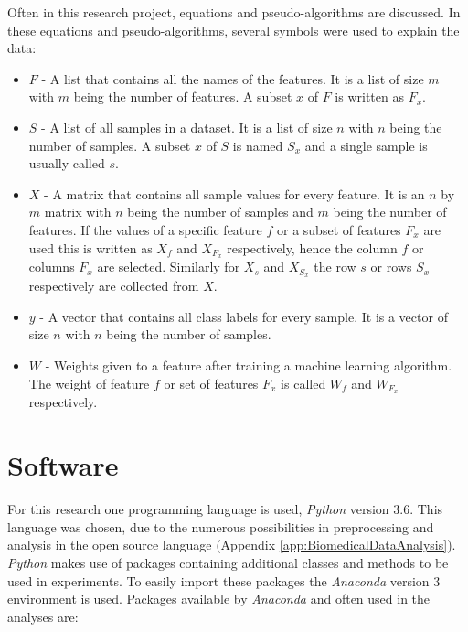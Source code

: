 \documentclass[10pt,a4paper]{report}
\begin{document}
	Often in this research project, equations and pseudo-algorithms are discussed. In these equations and pseudo-algorithms, several symbols were used to explain the data:
	
	\begin{itemize}
		\item \textit{$F$} -
		A list that contains all the names of the features. It is a list of size $m$ with $m$ being the number of features. A subset $x$ of $F$ is written as $F_x$.
		\item \textit{$S$} -  
		A list of all samples in a dataset. It is a list of size $n$ with $n$ being the number of samples. A subset $x$ of $S$ is named $S_x$ and a single sample is usually called $s$. 
		\item \textit{$X$} -
		A matrix that contains all sample values for every feature. It is an $n$ by $m$ matrix with $n$ being the number of samples and $m$ being the number of features. If the values of a specific feature $f$ or a subset of features $F_x$ are used this is written as $X_f$ and $X_{F_x}$ respectively, hence the column $f$ or columns $F_x$ are selected. Similarly for $X_s$ and $X_{S_x}$ the row $s$ or rows $S_x$ respectively are collected from $X$.
		\item \textit{$y$} -
		A vector that contains all class labels for every sample. It is a vector of size $n$ with $n$ being the number of samples.
		\item \textit{$W$} - 
		Weights given to a feature after training a machine learning algorithm. The weight of feature $f$ or set of features $F_x$ is called $W_f$ and $W_{F_x}$ respectively.
	\end{itemize}
	
	
	\section{Software}
	\label{PLsec:Software}
	
	For this research one programming language is used, \textit{Python} version 3.6. This language was chosen, due to the numerous possibilities in preprocessing and analysis in the open source language\cite{mckinney2010data} (Appendix \ref{app:BiomedicalDataAnalysis}). \textit{Python} makes use of packages containing additional classes and methods to be used in experiments. To easily import these packages the \textit{Anaconda} version 3 environment is used\cite{yan2018hands}. Packages available by \textit{Anaconda} and often used in the analyses are:
	
\end{document}
